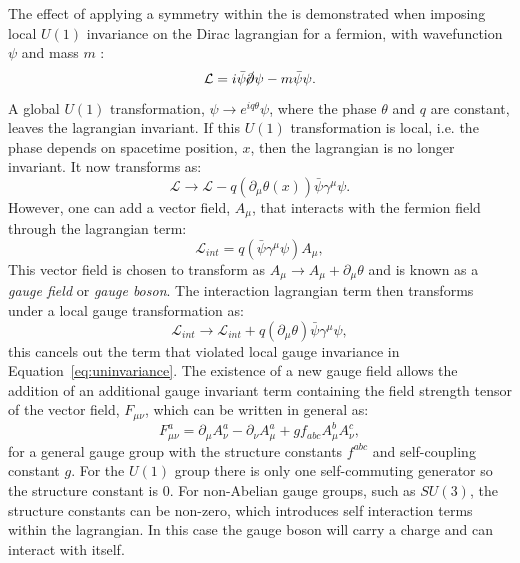 The effect of applying a symmetry within the \SM is demonstrated when
imposing local $U(1)$ invariance on the Dirac lagrangian for a
fermion, with wavefunction $\psi$ and mass $m$ \cite{Griffiths:111880}:
\begin{equation}
\mathcal{L}=i\bar{\psi}\cancel{\partial}\psi-m\bar{\psi}\psi.
\end{equation}
A global $U(1)$ transformation, $\psi\rightarrow e^{iq\theta}\psi$,
where the phase $\theta$ and $q$ are constant,
leaves the lagrangian invariant. If this $U(1)$ transformation is
local, i.e. the phase depends on spacetime position, $x$, then the
lagrangian is no longer invariant. It now transforms as:
\begin{equation}
\label{eq:uninvariance}
\mathcal{L}\rightarrow\mathcal{L}-q(\partial_{\mu}\theta(x))\bar{\psi}\gamma^{\mu}\psi.
\end{equation}
However, one can add a vector field, $A_{\mu}$, that interacts with
the fermion field through the lagrangian term:
\begin{equation}
\mathcal{L}_{int}=q(\bar{\psi}\gamma^{\mu}\psi) A_{\mu},
\end{equation}
This vector field is chosen to transform as $A_{\mu}\rightarrow
A_{\mu}+\partial_{\mu}\theta$ and is known as a \emph{gauge field} or
\emph{gauge boson}. The interaction lagrangian term then transforms
under a local gauge transformation as:
\begin{equation}
\mathcal{L}_{int}\rightarrow \mathcal{L}_{int}+q(\partial_{\mu}\theta)\bar{\psi}\gamma^{\mu}\psi,
\end{equation}
this cancels out the term that violated local gauge invariance in
Equation~\ref{eq:uninvariance}. The existence of a new gauge field
allows the addition of an additional gauge invariant term containing
the field strength tensor of the vector field, $F_{\mu\nu}$, which can
be written in general as:
\begin{equation}
F_{\mu\nu}^a=\partial_{\mu}A_{\nu}^a-\partial_{\nu}A_{\mu}^a+gf_{abc}A_{\mu}^{b}A_{\nu}^{c},
\end{equation}
for a general gauge group with the structure constants $f^{abc}$ and
self-coupling constant $g$. For
the $U(1)$ group there is only one self-commuting generator so the
structure constant is 0. For non-Abelian gauge groups, such as
$SU(3)$, the structure constants can be non-zero, which introduces
self interaction terms within the lagrangian. In this case the gauge
boson will carry a charge and can interact with itself.

